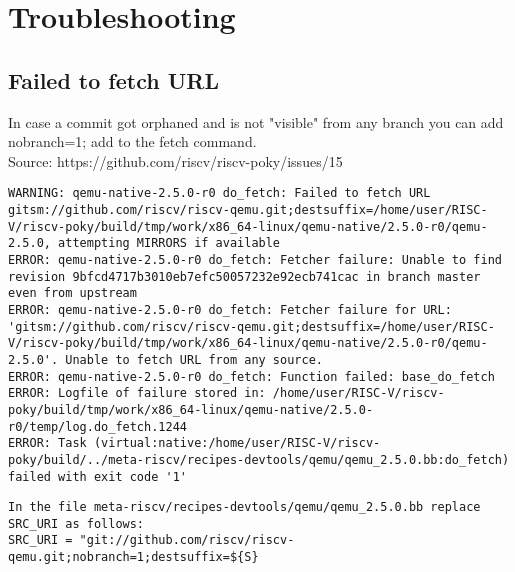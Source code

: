 \section{Troubleshooting}
\subsection{Failed to fetch URL}
 In case a commit got orphaned and is not "visible" from any branch you can add nobranch=1; add to the fetch command.
 \\
 Source: https://github.com/riscv/riscv-poky/issues/15

\begin{verbatim}
WARNING: qemu-native-2.5.0-r0 do_fetch: Failed to fetch URL gitsm://github.com/riscv/riscv-qemu.git;destsuffix=/home/user/RISC-V/riscv-poky/build/tmp/work/x86_64-linux/qemu-native/2.5.0-r0/qemu-2.5.0, attempting MIRRORS if available
ERROR: qemu-native-2.5.0-r0 do_fetch: Fetcher failure: Unable to find revision 9bfcd4717b3010eb7efc50057232e92ecb741cac in branch master even from upstream
ERROR: qemu-native-2.5.0-r0 do_fetch: Fetcher failure for URL: 'gitsm://github.com/riscv/riscv-qemu.git;destsuffix=/home/user/RISC-V/riscv-poky/build/tmp/work/x86_64-linux/qemu-native/2.5.0-r0/qemu-2.5.0'. Unable to fetch URL from any source.
ERROR: qemu-native-2.5.0-r0 do_fetch: Function failed: base_do_fetch
ERROR: Logfile of failure stored in: /home/user/RISC-V/riscv-poky/build/tmp/work/x86_64-linux/qemu-native/2.5.0-r0/temp/log.do_fetch.1244
ERROR: Task (virtual:native:/home/user/RISC-V/riscv-poky/build/../meta-riscv/recipes-devtools/qemu/qemu_2.5.0.bb:do_fetch) failed with exit code '1'
\end{verbatim}
\begin{verbatim}
In the file meta-riscv/recipes-devtools/qemu/qemu_2.5.0.bb replace SRC_URI as follows:
SRC_URI = "git://github.com/riscv/riscv-qemu.git;nobranch=1;destsuffix=${S}
\end{verbatim}





